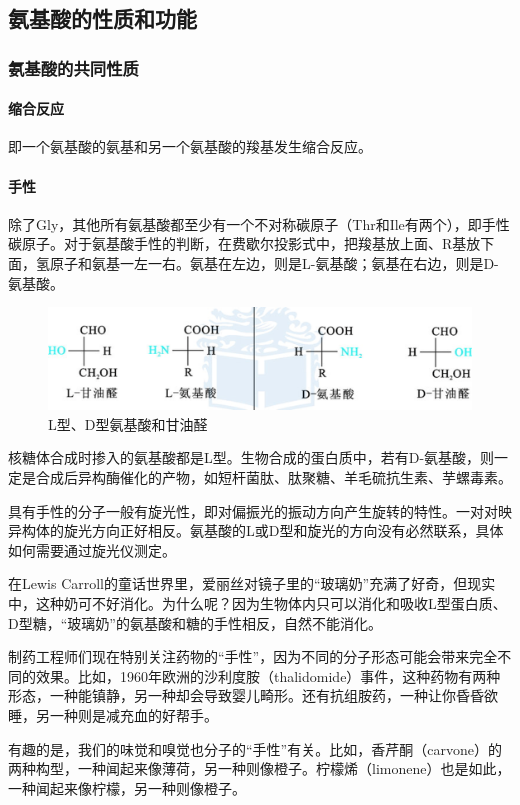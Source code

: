 \subsection{氨基酸的性质和功能}

\subsubsection{氨基酸的共同性质}

\paragraph{缩合反应}

即一个氨基酸的氨基和另一个氨基酸的羧基发生缩合反应。

\paragraph{手性}

除了Gly，其他所有氨基酸都至少有一个不对称碳原子（Thr和Ile有两个），即手性碳原子。对于氨基酸手性的判断，在费歇尔投影式中，把羧基放上面、R基放下面，氢原子和氨基一左一右。氨基在左边，则是L-氨基酸；氨基在右边，则是D-氨基酸。

\begin{figure}[htbp]
	\centering
	\includegraphics[width=0.8\linewidth]{Pics/L,D-aas}
	\caption{L型、D型氨基酸和甘油醛}
	\label{fig:ld-aas}
\end{figure}


核糖体合成时掺入的氨基酸都是L型。生物合成的蛋白质中，若有D-氨基酸，则一定是合成后异构酶催化的产物，如短杆菌肽、肽聚糖、羊毛硫抗生素、芋螺毒素。

具有手性的分子一般有旋光性，即对偏振光的振动方向产生旋转的特性。一对对映异构体的旋光方向正好相反。氨基酸的L或D型和旋光的方向没有必然联系，具体如何需要通过旋光仪测定。

\begin{gs}[:手性]
	\hspace{2em}在Lewis Carroll的童话世界里，爱丽丝对镜子里的“玻璃奶”充满了好奇，但现实中，这种奶可不好消化。为什么呢？因为生物体内只可以消化和吸收L型蛋白质、D型糖，“玻璃奶”的氨基酸和糖的手性相反，自然不能消化。

	\hspace{2em}制药工程师们现在特别关注药物的“手性”，因为不同的分子形态可能会带来完全不同的效果。比如，1960年欧洲的沙利度胺（thalidomide）事件，这种药物有两种形态，一种能镇静，另一种却会导致婴儿畸形。还有抗组胺药，一种让你昏昏欲睡，另一种则是减充血的好帮手。

	\hspace{2em}有趣的是，我们的味觉和嗅觉也分子的“手性”有关。比如，香芹酮（carvone）的两种构型，一种闻起来像薄荷，另一种则像橙子。柠檬烯（limonene）也是如此，一种闻起来像柠檬，另一种则像橙子。
\end{gs}


